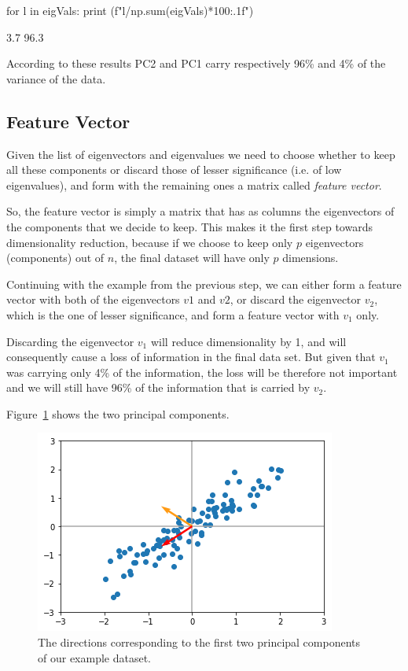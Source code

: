 \begin{ipython}
for l in eigVals:
    print (f"{l/np.sum(eigVals)*100:.1f}")
\end{ipython}
\begin{ioutput}
3.7
96.3
\end{ioutput}

According to these results PC2 and PC1 carry respectively 96\% and 4\% of the variance of the data.

\subsection{Feature Vector}
Given the list of eigenvectors and eigenvalues we need to choose whether to keep all these components or discard those of lesser significance (i.e. of low eigenvalues), and form with the remaining ones a matrix called \emph{feature vector}.

So, the feature vector is simply a matrix that has as columns the eigenvectors of the components that we decide to keep. This makes it the first step towards dimensionality reduction, because if we choose to keep only $p$ eigenvectors (components) out of $n$, the final dataset will have only $p$ dimensions.

Continuing with the example from the previous step, we can either form a feature vector with both of the eigenvectors $v1$ and $v2$, or discard the eigenvector $v_2$, which is the one of lesser significance, and form a feature vector with $v_1$ only.

Discarding the eigenvector $v_1$ will reduce dimensionality by 1, and will consequently cause a loss of information in the final data set. But given that $v_1$ was carrying only 4\% of the information, the loss will be therefore not important and we will still have 96\% of the information that is carried by $v_2$.

Figure~\ref{fig:pca_result} shows the two principal components.

\begin{figure}[htb]
	\centering
	\includegraphics[width=0.7\linewidth]{figures/pca_result}
	\caption{The directions corresponding to the first two principal 
		components of our example dataset.}
	\label{fig:pca_result}
\end{figure}

